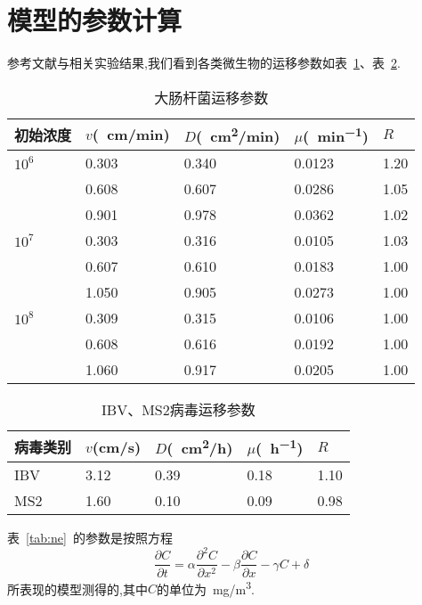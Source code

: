 \section{模型的参数计算}
参考文献与相关实验结果,我们看到各类微生物的运移参数如表~\ref{tab:dachangganjun}、表~\ref{tab:ibv}.
\begin{table}
\caption{大肠杆菌运移参数\label{tab:dachangganjun}}
\begin{tabularx}{14cm}{XXXXX}
\toprule
初始浓度 & $v$(\SI{}{cm/min}) & $D$(\SI{}{cm^2/min}) & $\mu$(\SI{}{min^{-1}}) & $R$\\
\midrule
$10^6$	&	0.303	&	0.340	&	0.0123	&	1.20 \\
		&	0.608	&	0.607	&	0.0286	&	1.05 \\
		&	0.901	&	0.978	&	0.0362	&	1.02 \\
$10^7$	&	0.303	&	0.316	&	0.0105	&	1.03 \\
		&	0.607	&	0.610	&	0.0183	&	1.00 \\
		&	1.050	&	0.905	&	0.0273	&	1.00 \\
$10^8$	&	0.309	&	0.315	&	0.0106	&	1.00 \\
		&	0.608	&	0.616	&	0.0192	&	1.00 \\
		&	1.060	&	0.917	&	0.0205	&	1.00 \\
\bottomrule
\end{tabularx}
\end{table}
\par
\begin{table}
\centering
\caption{\label{tab:ibv}IBV、MS2病毒运移参数}
\begin{tabularx}{14cm}{XXXXX}
\toprule
病毒类别 & $v$(cm/s) & $D$(\SI{}{cm^2/h}) & $\mu$(\SI{}{h^{-1}}) & $R$\\
\midrule
IBV		& 3.12	& 0.39	&	0.18	&	1.10	\\
MS2		& 1.60	& 0.10	&	0.09	&	0.98	\\
\bottomrule
\end{tabularx}
\end{table}
\par
表~\ref{tab:ne}~的参数是按照方程
\begin{equation}
	\dfrac{\partial C}{\partial t}= \alpha\dfrac{\partial^2 C}{\partial x^2}-\beta\dfrac{\partial C}{\partial x}-\gamma C + \delta
\end{equation}
所表现的模型测得的,其中$C$的单位为\SI{}{mg/m^3}.\par
